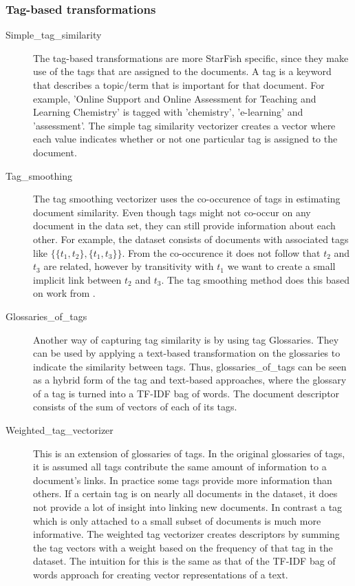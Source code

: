 \subsubsection{Tag-based transformations}
\begin{description}
\item[Simple\_tag\_similarity] The tag-based transformations are more StarFish specific, since they make use of the tags that are assigned to the documents. A tag is a keyword that describes a topic/term that is important for that document. For example, 'Online Support and Online Assessment for Teaching and Learning Chemistry' is tagged with 'chemistry', 'e-learning' and 'assessment'. The simple tag similarity vectorizer creates a vector where each value indicates whether or not one particular tag is assigned to the document. 

\item [Tag\_smoothing] The tag smoothing vectorizer uses the co-occurence of tags in estimating document similarity. Even though tags might not co-occur on any document in the data set, they can still provide information about each other. For example, the dataset consists of documents with associated tags like $\{\{t_1, t_2\}, \{t_1, t_3\}\}$. From the co-occurence it does not follow that $t_2$ and $t_3$ are related, however by transitivity with $t_1$ we want to create a small implicit link between $t_2$ and $t_3$. The tag smoothing method does this based on work from \citet{zhou2011web}.

\item [Glossaries\_of\_tags] Another way of capturing tag similarity is by using tag Glossaries. They can be used by applying a text-based transformation on the glossaries to indicate the similarity between tags. Thus, glossaries\_of\_tags can be seen as a hybrid form of the tag and text-based approaches, where the glossary of a tag is turned into a TF-IDF bag of words. The document descriptor consists of the sum of vectors of each of its tags. 

\item [Weighted\_tag\_vectorizer] This is an extension of glossaries of tags.
  In the original glossaries of tags, it is assumed all tags contribute the
  same amount of information to a document's links. In practice some tags
  provide more information than others. If a certain tag is on nearly all
  documents in the dataset, it does not provide a lot of insight into linking
  new documents. In contrast a tag which is only attached to a small subset of
  documents is much more informative. The weighted tag vectorizer creates
  descriptors by summing the tag vectors with a weight based on the frequency
  of that tag in the dataset. The intuition for this is the same as that
  of the TF-IDF bag of words approach for creating vector representations
  of a text.
\end{description}

